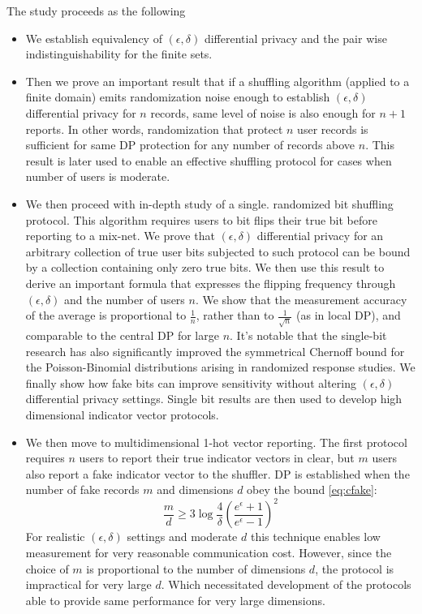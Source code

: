\documentclass[11pt]{article}
\begin{document}
The study proceeds as the following
\begin{itemize}

\item We establish equivalency of $(\epsilon,\delta)$ differential privacy and the pair wise indistinguishability for the finite sets.

\item Then we prove an important result that if a shuffling algorithm (applied to a finite domain) emits randomization noise enough to establish $(\epsilon,\delta)$ differential privacy for  $n$ records, same level of noise is also enough for $n+1$ reports. In other words, randomization that protect $n$ user records is sufficient for same DP protection for any number of records above $n$. This result is later used to enable an effective shuffling protocol for cases when number of users is moderate.

\item We then proceed with in-depth study of a single. randomized bit shuffling protocol. This algorithm requires users to bit flips their true bit before reporting to a mix-net.  We prove that  $(\epsilon,\delta)$ differential privacy for an arbitrary collection of true user bits subjected to such protocol can be bound by a collection containing only zero true bits.  We then use this result to derive an important formula that expresses the flipping frequency through $(\epsilon,\delta)$ and the number of users $n$.  We show that the measurement accuracy of the average is proportional to $\frac{1}{n}$, rather than to $\frac{1}{\sqrt{n}}$ (as in local DP), and comparable to the central DP for large $n$.  It's notable that the single-bit research has also significantly improved the symmetrical  Chernoff bound for the Poisson-Binomial distributions arising in randomized response studies.  We finally show how fake bits can improve sensitivity without altering $(\epsilon,\delta)$ differential privacy settings.  Single bit results are then used to develop high dimensional indicator vector protocols.

\item We then move to multidimensional 1-hot vector reporting.  The first protocol requires $n$ users to report their true indicator vectors in clear, but $m$ users also report a fake indicator vector to the shuffler.  DP is established when the number of fake records $m$ and dimensions $d$ obey the bound \eqref{eq:cfake}:
\[ \frac{m}{d} \ge 3 \log {\frac{4}{\delta}} \left ( \frac{e^\epsilon +1}{e^\epsilon - 1} \right )^2 \]
For realistic  $(\epsilon,\delta)$ settings and moderate $d$ this technique enables low measurement for very reasonable communication cost. However, since the choice of $m$ is proportional to the number of dimensions $d$, the protocol is impractical for very large $d$.  Which necessitated development of the protocols able to provide same performance for very large dimensions.


\end{itemize}
\end{document}
